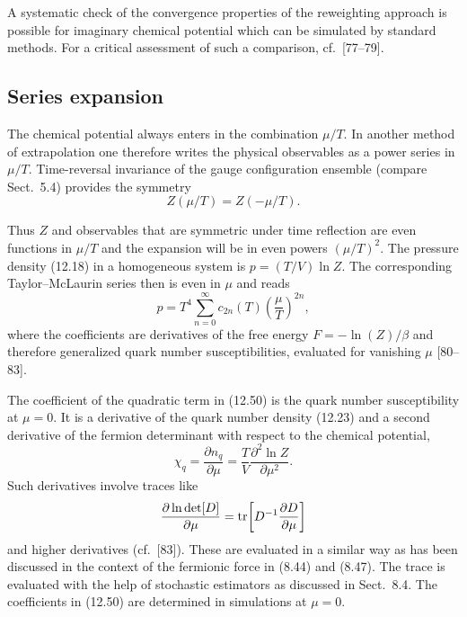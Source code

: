 A systematic check of the convergence properties of the reweighting approach is
possible for imaginary chemical potential which can be simulated by standard
methods. For a critical assessment of such a comparison, cf.\ [77--79].

\subsection{Series expansion}

The chemical potential always enters in the combination $\mu/T$. In another
method of extrapolation one therefore writes the physical observables as a
power series in $\mu/T$. Time-reversal invariance of the gauge configuration
ensemble (compare Sect.~5.4) provides the symmetry
\begin{equation}
  Z(\mu/T) = Z(-\mu/T).
\end{equation}

Thus $Z$ and observables that are symmetric under time reflection are even
functions in $\mu/T$ and the expansion will be in even powers $(\mu/T)^2$. The
pressure density (12.18) in a homogeneous system is $p = (T/V)\ln Z$. The
corresponding Taylor--McLaurin series then is even in $\mu$ and reads
\begin{equation}
  p = T^4\sum_{n=0}^{\infty} c_{2n}(T)\left(\frac{\mu}{T}\right)^{2n},
\end{equation}
where the coefficients are derivatives of the free energy $F = -\ln(Z)/\beta$
and therefore generalized quark number susceptibilities, evaluated for
vanishing $\mu$ [80--83].

The coefficient of the quadratic term in (12.50) is the quark number
susceptibility at $\mu = 0$. It is a derivative of the quark number density
(12.23) and a second derivative of the fermion determinant with respect to the
chemical potential,
\begin{equation}
  \chi_q = \frac{\partial n_q}{\partial\mu}
    = \frac{T}{V}\frac{\partial^2\ln Z}{\partial\mu^2}.
\end{equation}
Such derivatives involve traces like
\begin{equation}
  \frac{\partial\ln\det[D]}{\partial\mu}
  = \operatorname{tr}\!\left[D^{-1}\frac{\partial D}{\partial\mu}\right]
\end{equation}
and higher derivatives (cf.\ [83]). These are evaluated in a similar way as has
been discussed in the context of the fermionic force in (8.44) and (8.47). The
trace is evaluated with the help of stochastic estimators as discussed in
Sect.~8.4. The coefficients in (12.50) are determined in simulations at
$\mu = 0$.

